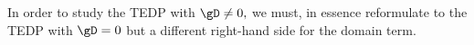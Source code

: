 In order to study the TEDP with $\gD\neq0,$ we must, in essence reformulate to the TEDP with $\gD=0$ but a different right-hand side for the domain term.

